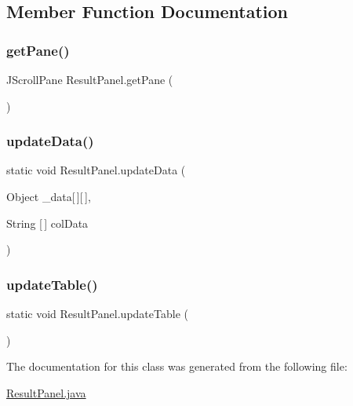 \subsection{Member Function Documentation}
\hypertarget{class_result_panel_ace0f4c9bd2c1ddadc0e0484ac9da3d2b}{}\label{class_result_panel_ace0f4c9bd2c1ddadc0e0484ac9da3d2b} 
\subsubsection{\texorpdfstring{get\+Pane()}{getPane()}}
{\footnotesize\ttfamily J\+Scroll\+Pane Result\+Panel.\+get\+Pane (\begin{DoxyParamCaption}{ }\end{DoxyParamCaption})}

\hypertarget{class_result_panel_a46714631f37ba703978bdd94e6a666d3}{}\label{class_result_panel_a46714631f37ba703978bdd94e6a666d3} 
\subsubsection{\texorpdfstring{update\+Data()}{updateData()}}
{\footnotesize\ttfamily static void Result\+Panel.\+update\+Data (\begin{DoxyParamCaption}\item[{Object}]{\+\_\+data\mbox{[}$\,$\mbox{]}\mbox{[}$\,$\mbox{]},  }\item[{String \mbox{[}$\,$\mbox{]}}]{col\+Data }\end{DoxyParamCaption})\hspace{0.3cm}{\ttfamily [static]}}

\hypertarget{class_result_panel_a91bbedbe216c200121a25a629bdc6d2f}{}\label{class_result_panel_a91bbedbe216c200121a25a629bdc6d2f} 
\subsubsection{\texorpdfstring{update\+Table()}{updateTable()}}
{\footnotesize\ttfamily static void Result\+Panel.\+update\+Table (\begin{DoxyParamCaption}{ }\end{DoxyParamCaption})\hspace{0.3cm}{\ttfamily [static]}}



The documentation for this class was generated from the following file\+:\begin{DoxyCompactItemize}
\item 
\hyperlink{_result_panel_8java}{Result\+Panel.\+java}\end{DoxyCompactItemize}
